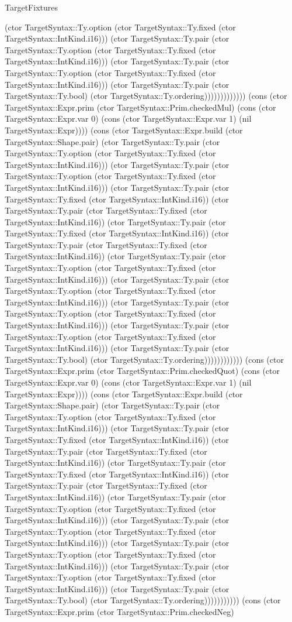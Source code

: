 \begin{lexlean}{TargetFixtures}
\begin{semanticmodule}
{(ctor TargetSyntax::Ty.option (ctor TargetSyntax::Ty.fixed (ctor TargetSyntax::IntKind.i16))) (ctor TargetSyntax::Ty.pair (ctor TargetSyntax::Ty.option (ctor TargetSyntax::Ty.fixed (ctor TargetSyntax::IntKind.i16))) (ctor TargetSyntax::Ty.pair (ctor TargetSyntax::Ty.option (ctor TargetSyntax::Ty.fixed (ctor TargetSyntax::IntKind.i16))) (ctor TargetSyntax::Ty.pair (ctor TargetSyntax::Ty.bool) (ctor TargetSyntax::Ty.ordering))))))))))))) (cons (ctor TargetSyntax::Expr.prim (ctor TargetSyntax::Prim.checkedMul) (cons (ctor TargetSyntax::Expr.var 0) (cons (ctor TargetSyntax::Expr.var 1) (nil TargetSyntax::Expr)))) (cons (ctor TargetSyntax::Expr.build (ctor TargetSyntax::Shape.pair) (ctor TargetSyntax::Ty.pair (ctor TargetSyntax::Ty.option (ctor TargetSyntax::Ty.fixed (ctor TargetSyntax::IntKind.i16))) (ctor TargetSyntax::Ty.pair (ctor TargetSyntax::Ty.option (ctor TargetSyntax::Ty.fixed (ctor TargetSyntax::IntKind.i16))) (ctor TargetSyntax::Ty.pair (ctor TargetSyntax::Ty.fixed (ctor TargetSyntax::IntKind.i16)) (ctor TargetSyntax::Ty.pair (ctor TargetSyntax::Ty.fixed (ctor TargetSyntax::IntKind.i16)) (ctor TargetSyntax::Ty.pair (ctor TargetSyntax::Ty.fixed (ctor TargetSyntax::IntKind.i16)) (ctor TargetSyntax::Ty.pair (ctor TargetSyntax::Ty.fixed (ctor TargetSyntax::IntKind.i16)) (ctor TargetSyntax::Ty.pair (ctor TargetSyntax::Ty.option (ctor TargetSyntax::Ty.fixed (ctor TargetSyntax::IntKind.i16))) (ctor TargetSyntax::Ty.pair (ctor TargetSyntax::Ty.option (ctor TargetSyntax::Ty.fixed (ctor TargetSyntax::IntKind.i16))) (ctor TargetSyntax::Ty.pair (ctor TargetSyntax::Ty.option (ctor TargetSyntax::Ty.fixed (ctor TargetSyntax::IntKind.i16))) (ctor TargetSyntax::Ty.pair (ctor TargetSyntax::Ty.option (ctor TargetSyntax::Ty.fixed (ctor TargetSyntax::IntKind.i16))) (ctor TargetSyntax::Ty.pair (ctor TargetSyntax::Ty.bool) (ctor TargetSyntax::Ty.ordering)))))))))))) (cons (ctor TargetSyntax::Expr.prim (ctor TargetSyntax::Prim.checkedQuot) (cons (ctor TargetSyntax::Expr.var 0) (cons (ctor TargetSyntax::Expr.var 1) (nil TargetSyntax::Expr)))) (cons (ctor TargetSyntax::Expr.build (ctor TargetSyntax::Shape.pair) (ctor TargetSyntax::Ty.pair (ctor TargetSyntax::Ty.option (ctor TargetSyntax::Ty.fixed (ctor TargetSyntax::IntKind.i16))) (ctor TargetSyntax::Ty.pair (ctor TargetSyntax::Ty.fixed (ctor TargetSyntax::IntKind.i16)) (ctor TargetSyntax::Ty.pair (ctor TargetSyntax::Ty.fixed (ctor TargetSyntax::IntKind.i16)) (ctor TargetSyntax::Ty.pair (ctor TargetSyntax::Ty.fixed (ctor TargetSyntax::IntKind.i16)) (ctor TargetSyntax::Ty.pair (ctor TargetSyntax::Ty.fixed (ctor TargetSyntax::IntKind.i16)) (ctor TargetSyntax::Ty.pair (ctor TargetSyntax::Ty.option (ctor TargetSyntax::Ty.fixed (ctor TargetSyntax::IntKind.i16))) (ctor TargetSyntax::Ty.pair (ctor TargetSyntax::Ty.option (ctor TargetSyntax::Ty.fixed (ctor TargetSyntax::IntKind.i16))) (ctor TargetSyntax::Ty.pair (ctor TargetSyntax::Ty.option (ctor TargetSyntax::Ty.fixed (ctor TargetSyntax::IntKind.i16))) (ctor TargetSyntax::Ty.pair (ctor TargetSyntax::Ty.option (ctor TargetSyntax::Ty.fixed (ctor TargetSyntax::IntKind.i16))) (ctor TargetSyntax::Ty.pair (ctor TargetSyntax::Ty.bool) (ctor TargetSyntax::Ty.ordering))))))))))) (cons (ctor TargetSyntax::Expr.prim (ctor TargetSyntax::Prim.checkedNeg) }
\end{semanticmodule}
\end{lexlean}
